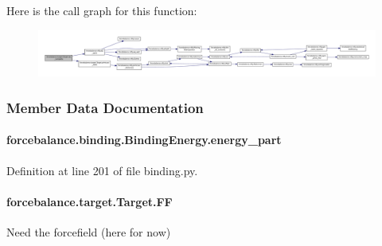 Here is the call graph for this function\-:\nopagebreak
\begin{figure}[H]
\begin{center}
\leavevmode
\includegraphics[width=350pt]{classforcebalance_1_1target_1_1Target_af6099ec09486213869dba2491bd8ea04_cgraph}
\end{center}
\end{figure}




\subsubsection{Member Data Documentation}
\hypertarget{classforcebalance_1_1binding_1_1BindingEnergy_a4efa69b8f81d993b58851650d9b5ef89}{
\paragraph[{energy\-\_\-part}]{\setlength{\rightskip}{0pt plus 5cm}forcebalance.\-binding.\-Binding\-Energy.\-energy\-\_\-part}}\label{classforcebalance_1_1binding_1_1BindingEnergy_a4efa69b8f81d993b58851650d9b5ef89}


Definition at line 201 of file binding.\-py.

\hypertarget{classforcebalance_1_1target_1_1Target_a38a37919783141ea37fdcf8b00ce0aaf}{
\paragraph[{F\-F}]{\setlength{\rightskip}{0pt plus 5cm}forcebalance.\-target.\-Target.\-F\-F\hspace{0.3cm}{\ttfamily [inherited]}}}\label{classforcebalance_1_1target_1_1Target_a38a37919783141ea37fdcf8b00ce0aaf}


Need the forcefield (here for now) 



